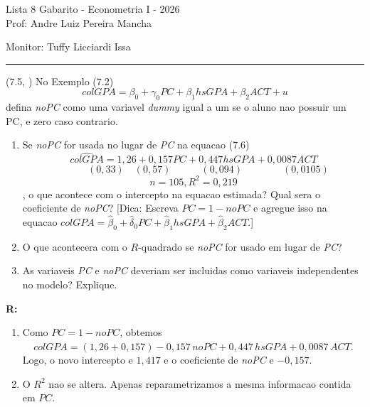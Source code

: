 \documentclass[12pt,letterpaper, onecolumn]{exam}
\renewenvironment{solution}
{\par\noindent\textbf{R:}\enspace\color{blue}}
{\par\color{black}}
\begin{document}
\begingroup
\centering
\LARGE Lista 8 Gabarito - Econometria I - 2026\\[0.5em]
\large Prof: Andre Luiz Pereira Mancha \par
\large Monitor: Tuffy Licciardi Issa \par
\endgroup
\rule{\textwidth}{0.4pt}
\pointsdroppedatright
\printanswers
\renewcommand{\solutiontitle}{\noindent\textbf{Ans:}\enspace}
\newcommand{\qstar}{\hspace{-0.6em}\textsuperscript{*}\hspace{0.2em}}

\begin{questions}

\question (7.5, \citep{wooldridge2016}) No Exemplo (7.2)
\[
colGPA = \beta_0 + \gamma_0PC + \beta_1hsGPA + \beta_2ACT + u
\]
defina \textit{noPC} como uma variavel \textit{dummy} igual a um se o aluno nao possuir um PC, e zero caso contrario.
\begin{enumerate}[label=(\roman*)]
    \item Se \textit{noPC} for usada no lugar de \textit{PC} na equacao (7.6)
    \[
    \widehat{colGPA} = 1,26 + 0,157PC + 0,447hsGPA + 0,0087ACT
    \]
    \[
    \quad \quad \quad (0,33) \quad (0,57) \quad \quad \quad(0,094)  \quad  \quad \quad \quad (0,0105)
    \]
    \[
    n = 105, R^2 =0,219
    \]
    , o que acontece com o intercepto na equacao estimada? Qual sera o coeficiente de \textit{noPC}? [Dica: Escreva \(PC = 1 - noPC\) e agregue isso na equacao \(colGPA = \hat\beta_0 + \hat\delta_0 PC + \hat\beta_1 hsGPA + \hat\beta_2 ACT\).]
    \item O que acontecera com o \(R\)-quadrado se \textit{noPC} for usado em lugar de \textit{PC}?
    \item As variaveis \textit{PC} e \textit{noPC} deveriam ser incluidas como variaveis independentes no modelo? Explique.
\end{enumerate}

\begin{solution}
\begin{enumerate}[label=(\roman*)]
    \item Como \(PC = 1 - noPC\), obtemos
    \[
    \widehat{colGPA}
    =
    (1,26 + 0,157) - 0,157\,noPC + 0,447\,hsGPA + 0,0087\,ACT.
    \]
    Logo, o novo intercepto e \(1,417\) e o coeficiente de \textit{noPC} e \(-0,157\).

    \item O \(R^2\) nao se altera. Apenas reparametrizamos a mesma informacao contida em \(PC\).


\end{enumerate}
\end{solution}
\end{questions}
\end{document}
